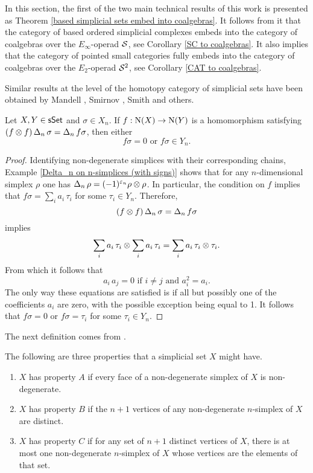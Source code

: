 \documentclass[main.tex]{subfiles}
\begin{document}
In this section, the first of the two main technical results of this work is presented as Theorem \ref{based simplicial sets embed into coalgebras}. It follows from it that the category of based ordered simplicial complexes embeds into the category of coalgebras over the $E_\infty$-operad $\S$, see Corollary \ref{SC to coalgebras}. It also implies that the category of pointed small categories fully embeds into the category of coalgebras over the $E_2$-operad $\S^2$, see Corollary \ref{CAT to coalgebras}.

Similar results at the level of the homotopy category of simplicial sets have been obtained by Mandell \cite{Man06}, Smirnov \cite{Smi98}, Smith \cite{Smi15} and others.

\begin{lemma} \label{simplices to simplices}
Let $X,Y\in\sSet$ and $\sigma\in X_n$. If $f:\chains(X)\to\chains(Y)$ is a homomorphism satisfying $(f\tensor f)\cop_n\sigma=\cop_n f\sigma$, then either $$f\sigma=0\text{\ \ or\ \ }f\sigma\in Y_n.$$
\begin{proof}
Identifying non-degenerate simplices with their corresponding chains, Example \ref{Delta_n on n-simplices (with signs)} shows that for any $n$-dimensional simplex $\rho$ one has $\cop_n\rho=(-1)^{\varepsilon_n}\rho\tensor\rho$. In particular, the condition on $f$ implies that $f\sigma=\sum_ia_i\,\tau_i$ for some $\tau_i\in Y_n$. Therefore,
$$(f\tensor f)\cop_n\sigma=\cop_n f\sigma$$ implies $$\sum_ia_i\,\tau_i\tensor \sum_ia_i\,\tau_i = \sum_ia_i\,\tau_i\tensor\tau_i. $$
From which it follows that
$$a_i\,a_j=0 \text{ if } i\neq j \text{ and } a_i^2=a_i.$$
The only way these equations are satisfied is if all but possibly one of the coefficients $a_i$ are zero, with the possible exception being equal to 1. It follows that $f\sigma=0$ or $f\sigma=\tau_i$ for some $\tau_i\in Y_n$.
\end{proof}
\end{lemma}

The next definition comes from \cite{May03}.

\begin{definition} The following are three properties that a simplicial set $X$ might have.
\begin{enumerate}[$(A)$]
\item $X$ has property $A$ if every
face of a non-degenerate simplex of $X$ is non-degenerate.
\item $X$ has property $B$ if the $n+1$ vertices
of any non-degenerate $n$-simplex of $X$ are distinct.
\item $X$ has property $C$ if for any set of
$n+1$ distinct vertices of $X$, there is at most one non-degenerate $n$-simplex of
$X$ whose vertices are the elements of that set.
\end{enumerate}
\end{definition}
\end{document}
